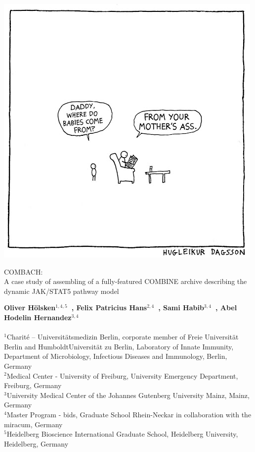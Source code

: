 \begin{titlepage}


\begin{centering}
\includegraphics[scale=0.5]{unnamed.jpg}
\vspace{1cm}

{\noindent\huge{COMBACH:\\ A case study of assembling of a fully-featured COMBINE archive describing the dynamic JAK/STAT5 pathway model}}

\end{centering}


\vspace{2cm}
\noindent\textbf{Oliver H\"olsken$^{1,4,5}$~, Felix Patricius Hans$^{2,4}$~, Sami Habib$^{3,4}$~, Abel Hodelin Hernandez$^{3,4}$~}
\\ \\
	\small $^{1}$Charité – Universit\"atsmedizin Berlin, corporate member of Freie Universit\"at Berlin and HumboldtUniversit\"at zu Berlin, Laboratory of Innate Immunity, Department of Microbiology, Infectious Diseases and Immunology, Berlin, Germany \\
	\small $^{2}$Medical Center - University of Freiburg, University Emergency Department, Freiburg, Germany \\
	\small $^{3}$University Medical Center of the Johannes Gutenberg University Mainz, Mainz, Germany \\
	\small $^{4}$Master Program - \ac{bids}, Graduate School Rhein-Neckar in collaboration with the \ac{miracum}, Germany \\
	\small $^{5}$Heidelberg Bioscience International Graduate School, Heidelberg University, Heidelberg, Germany \\
	\\



\end{titlepage}
